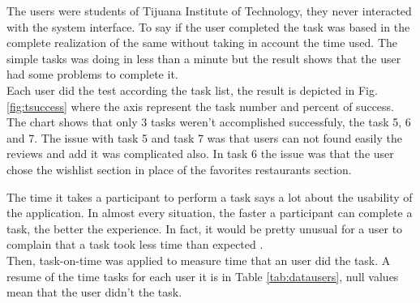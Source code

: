 The users were students of Tijuana Institute of Technology, they never
interacted with the system interface. To say if the user completed the task was
based in the complete realization of the same without taking in account the time
used. The simple tasks was doing in less than a minute but the result shows that
the user had some problems to complete it.\\    Each user did the test according
the task list, the result is depicted in Fig.\ref{fig:tsuccess} where the axis
represent the task number and percent of success. The chart shows that only 3
tasks weren't accomplished successfuly, the task 5, 6 and 7. The issue with task
5 and task 7 was that users can not found easily the reviews and add it was
complicated also. In task 6 the issue was that the user chose the wishlist
section in place of the favorites restaurants section.\\

\begin{figure*}
\captionsetup{justification=centering,margin=1cm}
\centering
{} %
\caption{Representation of the percent of success for each task.}
\label{fig:tsuccess}   
\end{figure*}

The time it takes a participant to perform a task says a lot about the usability
of the application. In almost every situation, the faster a participant can
complete a task, the better the experience. In fact, it would be pretty unusual
for a user to complain that a task took less time than expected
\cite{albert2013measuring}.\\ Then, task-on-time was applied to measure time
that an user did the task. A resume of the time tasks for each user it is in
Table \ref{tab:datausers}, null values mean that the user didn't the task.


